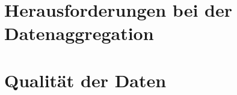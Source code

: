 \section{Herausforderungen bei der Datenaggregation}\label{sec:herausforderungen-datenaggregation}

\section{Qualität der Daten}\label{sec:qualitat-der-daten}


